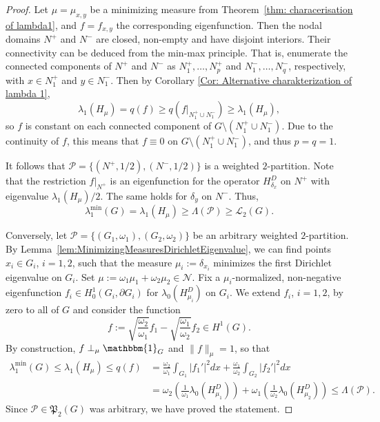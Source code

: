 \documentclass[reqno]{amsart}
\theoremstyle{plain}
\theoremstyle{definition}
\theoremstyle{remark}
\numberwithin{equation}{section}
\newcommand{\cN}{\mathcal{N}}
\newcommand{\cP}{\mathcal{P}}   %
\newcommand{\one}{\mathbbm{1}}
\begin{document}
\begin{proof}
Let $\mu = \mu_{x,y}$ be a minimizing measure from Theorem~\ref{thm: characerisation of lambda1}, and $f=f_{x,y}$ the corresponding eigenfunction. Then the nodal domains $N^+$ and $N^-$ are closed, non-empty and have disjoint interiors. Their connectivity can be deduced from the min-max principle. That is, enumerate the connected components of $N^+$ and $N^-$ as $N_1^+, \dots, N_p^+$ and $N_1^-, \dots, N_q^-$, respectively, with $x \in N^+_1$ and $y \in N^-_1$. Then by Corollary \ref{Cor: Alternative charakterization of lambda 1},
\[
\lambda_{1}(H_\mu) = q(f) \geq q(f|_{N^+_1 \cup N^-_1}) \geq \lambda_{1}(H_\mu), 
\]
so $f$ is constant on each connected component of $G\setminus (N^+_1 \cup N^-_1)$. Due to the continuity of $f$, this means that $f \equiv 0$ on $G\setminus (N^+_1 \cup N^-_1)$, and thus $p=q =1$.

It follows that $\cP=\{(N^+, 1/2),(N^-, 1/2)\}$ is a weighted $2$-partition. Note that the restriction $f|_{N^+}$ is an eigenfunction for the operator $H_{\delta_x}^D$ on $N^+$ with eigenvalue $\lambda_{1}(H_\mu)/2$. The same holds for $\delta_{y}$ on $N^-$. Thus, 
\[
\lambda_{1}^{\min}(G) = \lambda_{1}(H_\mu) \ge \Lambda (\cP) \geq \mathcal{L}_2 (G). 
\]


Conversely, let $\cP=\{(G_1,\omega_1), (G_2, \omega_2)\}$ be an arbitrary weighted $2$-partition. By Lemma~\ref{lem:MinimizingMeasuresDirichletEigenvalue}, we can find points $x_i \in G_i $, $i=1,2$, such that the measure $\mu_i := \delta_{x_i}$ minimizes the first  Dirichlet eigenvalue on $G_i$. Set $\mu := \omega_1 \mu_1 + \omega_2 \mu_2 \in \cN$. Fix a $\mu_i$-normalized, non-negative eigenfunction $f_i \in H_0^1(G_i, \partial G_i)$ for $\lambda_0(H_{\mu_i}^D)$ on $G_i$. We extend $f_i$, $i=1,2$, by zero to all of $G$ and consider the function
\[
f:=\sqrt{\frac{\omega_2}{\omega_1}} f_1-\sqrt{\frac{\omega_1}{\omega_2}}f_2 \in H^1(G).
\]
By construction, $f \perp_{\mu} \one_{G}$ and $\|f\|_\mu =1$, so that 
\begin{align*}
	\lambda_{1}^{\min}(G) \leq \lambda_{1}(H_\mu) \leq q(f) &= \frac{\omega_2}{\omega_1}   \int_{G_1} |f_1'|^2dx + \frac{\omega_1}{\omega_2}\int_{G_2} |f_2'|^2dx \\
	&= \omega_2 (\frac{1}{\omega_1}\lambda_{0}(H_{\mu_1}^D)) + \omega_1(\frac{1}{\omega_2}\lambda_{0}(H_{ \mu_2 }^D)) \leq  \Lambda(\cP).
\end{align*}
Since $\cP\in \mathfrak{P}_2(G)$ was arbitrary, we have proved the statement. 
\end{proof}
\end{document}
